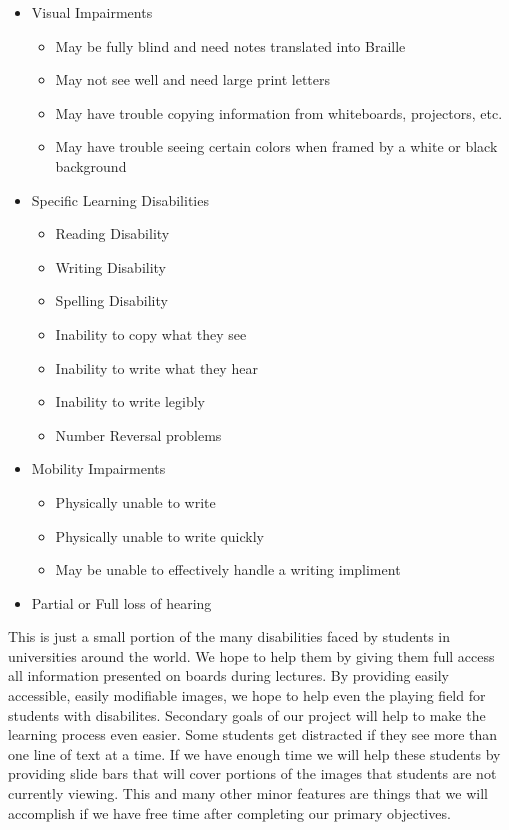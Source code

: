 \documentclass[]{article}
\begin{document}
    \begin{itemize}
        \item Visual Impairments
        \begin{itemize}
            \item May be fully blind and need notes translated into Braille
            \item May not see well and need large print letters
            \item May have trouble copying information from whiteboards, projectors, etc.
            \item May have trouble seeing certain colors when framed by a white or black background
        \end{itemize}
        \item Specific Learning Disabilities
        \begin{itemize}
            \item Reading Disability
            \item Writing Disability
            \item Spelling Disability
            \item Inability to copy what they see
            \item Inability to write what they hear
            \item Inability to write legibly
            \item Number Reversal problems
        \end{itemize}
        \item Mobility Impairments
        \begin{itemize}
            \item Physically unable to write
            \item Physically unable to write quickly
            \item May be unable to effectively handle a writing impliment
        \end{itemize}
        \item Partial or Full loss of hearing
    \end{itemize}

This is just a small portion of the many disabilities faced by students in universities around the world. We hope to help them by giving them full access all information presented on boards during lectures. By providing easily accessible, easily modifiable images, we hope to help even the playing field for students with disabilites.
Secondary goals of our project will help to make the learning process even easier. Some students get distracted if they see more than one line of text at a time. If we have enough time we will help these students by providing slide bars that will cover portions of the images that students are not currently viewing. This and many other minor features are things that we will accomplish if we have free time after completing our primary objectives.
\end{document}
